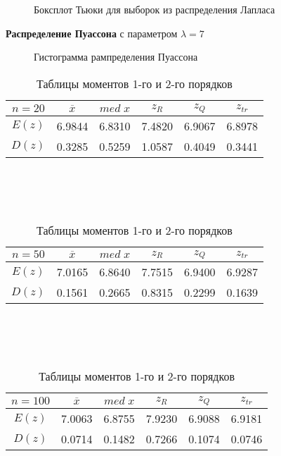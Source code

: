 \documentclass[12pt]{article}
\begin{document}
\begin{figure}[h!]
\centering
{}
\label{4_pic:2}
\caption{Боксплот Тьюки для выборок из распределения Лапласа}
\end{figure}

\newpage
\textbf{Распределение Пуассона} с параметром $\lambda = 7$  

\begin{figure}[h!]
	\centering
	\caption{Гистограмма рампределения Пуассона}
	\label{5_pic:1}
\end{figure}

\begin{table}[h!]
	\begin{tabular}{ | c | c | c | c | c | c |}
	\hline
	$n = 20$ & $\overline{x}$ & $med\;x$ & $z_R$ & $z_Q$ & $z_{tr}$ \\ \hline
	$E(z)$ & 6.9844 & 6.8310 & 7.4820 & 6.9067 & 6.8978 \\ \hline
	$D(z)$ & 0.3285 & 0.5259 & 1.0587 & 0.4049 & 0.3441 \\ \hline
	\end{tabular}
	\\
	\\ \\ 
	\begin{tabular}{ | c | c | c | c | c | c |}
	\hline
	$n = 50$ & $\overline{x}$ & $med\;x$ & $z_R$ & $z_Q$ & $z_{tr}$ \\ \hline
	$E(z)$ & 7.0165 & 6.8640 & 7.7515 & 6.9400 & 6.9287 \\ \hline
	$D(z)$ & 0.1561 & 0.2665 & 0.8315 & 0.2299 & 0.1639 \\ \hline
	\end{tabular}
	\\
	\\ \\ 
	\begin{tabular}{ | c | c | c | c | c | c |}
	\hline
	$n = 100$ & $\overline{x}$ & $med\;x$ & $z_R$ & $z_Q$ & $z_{tr}$ \\ \hline
	$E(z)$ & 7.0063 & 6.8755 & 7.9230 & 6.9088 & 6.9181 \\ \hline
	$D(z)$ & 0.0714 & 0.1482 & 0.7266 & 0.1074 & 0.0746 \\ \hline
	\end{tabular}
	\caption*{Таблицы моментов 1-го и 2-го порядков}
	\indent{}\\
	\\
\end{table}
\end{document}
